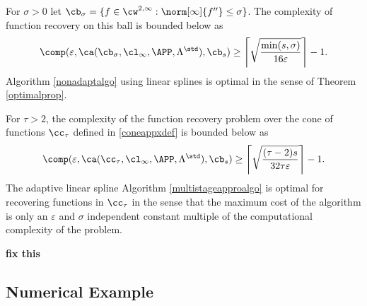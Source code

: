 \begin{theorem} \label{complowbdappr} For $\sigma>0$ let $\cb_{\sigma}=\{f \in \cw^{2,\infty} : \norm[\infty]{f''} \le \sigma\}$.  The complexity of function recovery on this ball is bounded below as
\begin{equation*}
\comp(\varepsilon,\ca(\cb_{\sigma},\cl_\infty,\APP,\Lambda^{\std}),\cb_{s}) \ge \left \lceil \sqrt{\frac{\min(s,\sigma)}{16 \varepsilon}} \right \rceil -1 .
\end{equation*}
Algorithm \ref{nonadaptalgo} using linear splines is optimal in the sense of Theorem \ref{optimalprop}.

For $\tau>2$, the complexity of the function recovery problem over the cone of functions $\cc_{\tau}$ defined in \eqref{coneappxdef} is bounded below as
\begin{equation*}
\comp(\varepsilon,\ca(\cc_{\tau},\cl_\infty,\APP,\Lambda^{\std}),\cb_{s}) \ge \left \lceil \sqrt{\frac{(\tau-2)s}{32 \tau \varepsilon}} \right \rceil-1 .
\end{equation*}
The adaptive linear spline Algorithm \ref{multistageapproalgo} is optimal for recovering functions in $\cc_{\tau}$ in the sense that the maximum cost of the algorithm is only an $\varepsilon$ and $\sigma$ independent constant multiple of the computational complexity of the problem. 
\end{theorem}

{\bf fix this}



\subsection{Numerical Example}

